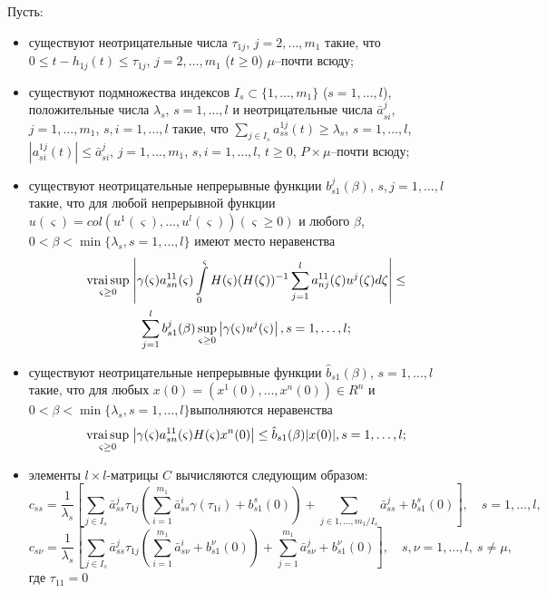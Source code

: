 Пусть:
\begin{itemize}
    \item существуют неотрицательные числа $\tau_{1j}$, $j = 2,\dots,m_1$
    такие, что $0 \leq
     t- h_{1j}(t) \leq \tau _{1j}$,  $j = 2,\dots,m_1$ ($t
     \geq 0$) $\mu $--почти всюду;

    \item существуют подмножества индексов $I_s \subset \{1,\dots, m_1\}$ ($s
    = 1,\dots, l$), положительные числа  $ \lambda _s$, $s = 1, \dots, l$ и
    неотрицательные числа $\bar a_{si}^j$, $j = 1, \dots, m_1$, $s,i = 1,
     \dots, l$ такие, что $\sum \limits_{j\in I_s}a^{1j}_{ss}(t) \geq
     \lambda _s$, $s = 1,\dots,l$, $|a^{1j}_{si}(t)|\leq \bar a^j_{si}$, $j =
     1,\dots,m_1$, $s,i = 1, \dots, l$, $t \geq 0$, $P\times\mu$--почти
    всюду;

    \item существуют неотрицательные непрерывные функции $b_{s1}^j(\beta)$,
    $s, j = 1, \dots, l$ такие, что для любой непрерывной функции
    $u(\varsigma ) = col (u^1 (\varsigma), \dots, u^l(\varsigma))
    (\varsigma\geq 0)$ и любого $\beta$, $0 < \beta < \min \{\lambda _s,
    s = 1,
    \dots, l \}$ имеют  место неравенства
     \begin{multline*}
     \mathrel {\mathop
     {\operatorname*{vrai} \sup}\limits _{\varsigma \geq 0}} \left |\gamma (\varsigma )a^{11}_{sn}(\varsigma )
    \int \limits _{0}^\varsigma H(\varsigma)(H(\zeta))^{-1}\sum \limits
    _{j=1}^l a_{nj}^{11}(\zeta)u^j(\zeta )d\zeta \right | \leq\\
    \sum\limits_{j=1}^lb_{s1}^j(\beta)\sup \limits _{\varsigma \geq 0}\left
    |\gamma (\varsigma)u^j(\varsigma)\right |, s = 1,\dots,l;
  \end{multline*}

    \item существуют неотрицательные непрерывные функции  $\hat
    b_{s1}(\beta)$, $s= 1, \dots, l$ такие,  что для любых  $ x (0) = (x^1
    (0), \dots, x^n(0)) \in R^n$  и $0 < \beta < \min \{\lambda _s, s = 1,
    \dots, l \}$выполняются неравенства
    \begin{equation*}
    \mathrel {\mathop
     {\operatorname*{vrai} \sup}\limits _{\varsigma \geq 0}} \left |\gamma (\varsigma )a^{11}_{sn}(\varsigma )
    H(\varsigma)x^n(0)\right | \leq \hat b_{s1}(\beta)|x(0)|, s =
    1,\dots,l;
    \end{equation*}

    \item элементы $l\times l$-матрицы $C$ вычисляются следующим образом:
    $$
    c_{ss} = \frac{1}{\lambda _s } \left [\sum \limits_{j \in I_s} \bar
    a^{j}_{ss}\tau _{1j}
     \left (\sum \limits_{i=1}^{m_1}\bar a^{i}_{ss} \gamma (\tau
     _{1i})
     + b^s_{s1}(0)\right )
     +\sum\limits_{j \in {1,\dots,m_1}/ I_s} \bar a^{j}_{ss} +
    b^s_{s1}(0)\right ], \quad  s = 1,\dots,l,
    $$
    $$
    c_{s\nu} = \frac{1}{\lambda _s } \left [\sum \limits_{j \in I_s}
    \bar a^{j}_{ss}\tau _{1j}
     \left (\sum \limits_{i=1}^{m_1}\bar a^{i}_{s\nu} + b^\nu_{s1}(0)\right )
    +\sum\limits_{j =1}^{m_1} \bar a^{j}_{s\nu} + b^\nu_{s1}(0)\right ],\quad s,\nu = 1,\dots,l, \ s \neq \mu,
    $$
    где $\tau _{11} = 0$
\end{itemize}


